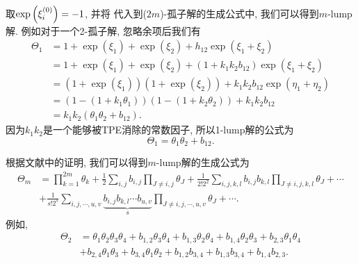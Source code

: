 取$\exp\left(\xi_i^{(0)}\right)=-1$, 并将 代入到($2m$)-孤子解的生成公式中, 我们可以得到$m$-lump解. 例如对于一个2-孤子解, 忽略余项后我们有
\begin{equation}
\begin{split}
\Theta_1&=1+\exp(\xi_1)+\exp(\xi_2)+h_{12}\exp(\xi_1+\xi_2) \\ 
&= 1+\exp(\xi_1)+\exp(\xi_2)+(1+k_1k_2b_{12})\exp(\xi_1+\xi_2) \\ 
&=(1+\exp(\xi_1))(1+\exp(\xi_2))+k_1k_2b_{12}\exp(\eta_1+\eta_2) \\ 
&=(1-(1+k_1\theta_1))(1-(1+k_2\theta_2))+k_1k_2b_{12} \\
&=k_1k_2(\theta_1\theta_2+b_{12}).
\end{split}
\end{equation}
因为$k_1k_2$是一个能够被TPE消除的常数因子, 所以1-lump解的公式为
\begin{equation}
    \Theta_1=\theta_1\theta_2+b_{12}.
\end{equation}

根据文献\cite{satsuma1979two}中的证明, 我们可以得到$m$-lump解的生成公式为
\begin{equation}
\begin{split}
    \Theta_m&=\prod_{k=1}^{2m}\theta_k+\frac{1}{2}\sum_{i,j}{b_{i,j}}\prod_{J\neq i,j}{\theta_J}+\frac{1}{2! 2^2}\sum_{i,j,k,l}{b_{i,j}b_{k,l}}\prod_{J\neq i,j,k,l}{\theta_{J}}+\cdots \\
    &+\frac{1}{s!2^s}\sum_{i,j,\cdots,u,v}\underbrace{{b_{i,j}b_{k,l}\cdots b_{u,v}}}_{s}\prod_{J\neq i,j,\cdots, u,v}{\theta_J}+\cdots. \label{f-lump-old}
\end{split}
\end{equation}
例如, 
\begin{equation}
\renewcommand{\t}[1]{\theta_{#1}}
\renewcommand{\b}[1]{b_{#1}}
\begin{split}
\Theta_2&=\t{1}\t{2}\t{3}\t{4}+\b{1,2}\t{3}\t{4}+\b{1,3}\t{2}\t{4}+\b{1,4}\t{2}\t{3}+\b{2,3}\t{1}\t{4}\\
&+\b{2,4}\t{1}\t{3}+\b{3,4}\t{1}\t{2}+\b{1,2}\b{3,4}+\b{1,3}\b{3,4}+\b{1,4}\b{2,3}.
\end{split}
\end{equation}


